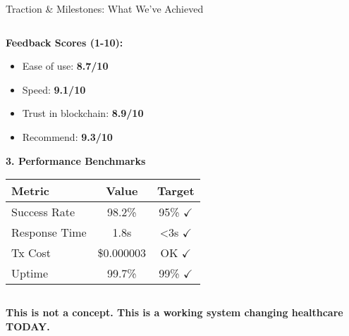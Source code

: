 \documentclass[aspectratio=169,xcolor=dvipsnames,20pt]{beamer}
\begin{document}
\begin{frame}{Traction \& Milestones: What We've Achieved}
\begin{columns}[T]
\begin{column}{0.5\textwidth}
      \textbf{Feedback Scores (1-10):}
      \begin{itemize}
        \item Ease of use: \textbf{8.7/10}
        \item Speed: \textbf{9.1/10}
        \item Trust in blockchain: \textbf{8.9/10}
        \item Recommend: \textbf{9.3/10}
      \end{itemize}

      \vspace{0.3cm}

      \textbf{\textcolor{SuccessGreen}{3. Performance Benchmarks}}

      \begin{table}
        \scriptsize
        \begin{tabular}{lcc}
          \toprule
          \textbf{Metric} & \textbf{Value} & \textbf{Target} \\
          \midrule
          Success Rate & 98.2\% & \textcolor{SuccessGreen}{95\% $\checkmark$} \\
          Response Time & 1.8s & \textcolor{SuccessGreen}{<3s $\checkmark$} \\
          Tx Cost & \$0.000003 & \textcolor{SuccessGreen}{OK $\checkmark$} \\
          Uptime & 99.7\% & \textcolor{SuccessGreen}{99\% $\checkmark$} \\
          \bottomrule
        \end{tabular}
      \end{table}
    \end{column}
  \end{columns}

  \vspace{0.3cm}

  \begin{center}
    \Large{\textbf{This is not a concept. This is a working system changing healthcare TODAY.}}
  \end{center}

\end{frame}
\end{document}
